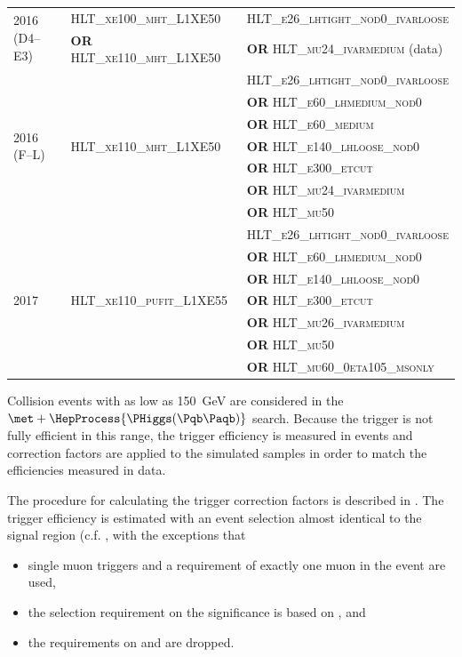 \begin{table}[hbtp]
{\begin{tabular}{l l l}
\midrule
\multirow{2}{*}{2016 (D4--E3)} & \textsc{HLT\_xe100\_mht\_L1XE50} & \textsc{HLT\_e26\_lhtight\_nod0\_ivarloose} \\
& \textbf{OR} \textsc{HLT\_xe110\_mht\_L1XE50} & \textbf{OR} \textsc{HLT\_mu24\_ivarmedium} (data) \\
\midrule
\multirow{7}{*}{2016 (F--L)} & \multirow{7}{*}{\textsc{HLT\_xe110\_mht\_L1XE50}} & \textsc{HLT\_e26\_lhtight\_nod0\_ivarloose} \\
& & \textbf{OR} \textsc{HLT\_e60\_lhmedium\_nod0} \\
& & \textbf{OR} \textsc{HLT\_e60\_medium} \\
& & \textbf{OR} \textsc{HLT\_e140\_lhloose\_nod0} \\
& & \textbf{OR} \textsc{HLT\_e300\_etcut} \\
& & \textbf{OR} \textsc{HLT\_mu24\_ivarmedium} \\
& & \textbf{OR} \textsc{HLT\_mu50} \\
\midrule
\multirow{7}{*}{2017} & \multirow{7}{*}{\textsc{HLT\_xe110\_pufit\_L1XE55}} & \textsc{HLT\_e26\_lhtight\_nod0\_ivarloose} \\
& & \textbf{OR} \textsc{HLT\_e60\_lhmedium\_nod0} \\
& & \textbf{OR} \textsc{HLT\_e140\_lhloose\_nod0} \\
& & \textbf{OR} \textsc{HLT\_e300\_etcut} \\
& & \textbf{OR} \textsc{HLT\_mu26\_ivarmedium} \\
& & \textbf{OR} \textsc{HLT\_mu50} \\
& & \textbf{OR} \textsc{HLT\_mu60\_0eta105\_msonly} \\
\bottomrule
\end{tabular}%
}
\end{table}

Collision events with \met as low as \SI{150}{\giga\electronvolt} are considered in the \(\met + \HepProcess{\PHiggs(\Pqb\Paqb)}\) search. Because the \met trigger is not fully efficient in this range, the trigger efficiency is measured in events and correction factors are applied to the simulated samples in order to match the efficiencies measured in data.

The procedure for calculating the \met trigger correction factors is described in .
The \MET trigger efficiency is estimated with an event selection almost identical to the signal region (c.f. , with the exceptions that
\begin{itemize}
  \item single muon triggers and a requirement of exactly one muon in the event are used,
  \item the selection requirement on the \met significance is based on \metnomu, and
  \item the requirements on \met and \mpt are dropped.
\end{itemize}

